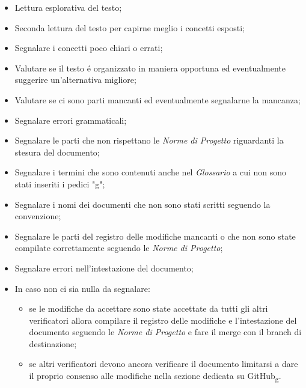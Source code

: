 \begin{itemize}
    \item Lettura esplorativa del testo;
    \item Seconda lettura del testo per capirne meglio i concetti esposti;
    \item Segnalare i concetti poco chiari o errati;
    \item Valutare se il testo é organizzato in maniera opportuna ed eventualmente suggerire un'alternativa migliore;
    \item Valutare se ci sono parti mancanti ed eventualmente segnalarne la mancanza;
    \item Segnalare errori grammaticali;
    \item Segnalare le parti che non rispettano le \textit{Norme di Progetto} riguardanti la stesura del documento;
    \item Segnalare i termini che sono contenuti anche nel \textit{Glossario} a cui non sono stati inseriti i pedici "g";
    \item Segnalare i nomi dei documenti che non sono stati scritti seguendo la convenzione;
    \item Segnalare le parti del registro delle modifiche mancanti o che non sono state compilate correttamente seguendo le \textit{Norme di Progetto};
    \item Segnalare errori nell'intestazione del documento;
    \item In caso non ci sia nulla da segnalare:
        \begin{itemize}
            \item se le modifiche da accettare sono state accettate da tutti gli altri verificatori allora compilare il registro delle modifiche 
                e l'intestazione del documento seguendo le \textit{Norme di Progetto} e fare il merge con il branch di destinazione;
            \item se altri verificatori devono ancora verificare il documento limitarsi a dare il proprio consenso alle modifiche nella sezione dedicata su GitHub\textsubscript{g}.
        \end{itemize}  
\end{itemize}